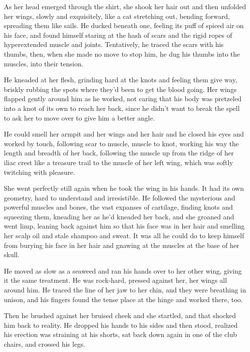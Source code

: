 As her head emerged through the shirt, she shook her hair out and then
unfolded her wings, slowly and exquisitely, like a cat stretching out,
bending forward, spreading them like sails.  He ducked beneath one,
feeling its puff of spiced air on his face, and found himself staring
at the hash of scars and the rigid ropes of hyperextended muscle and
joints.  Tentatively, he traced the scars with his thumbs, then, when
she made no move to stop him, he dug his thumbs into the muscles, into
their tension.

He kneaded at her flesh, grinding hard at the knots and feeling them
give way, briskly rubbing the spots where they'd been to get the blood
going.  Her wings flapped gently around him as he worked, not caring
that his body was pretzeled into a knot of its own to reach her back,
since he didn't want to break the spell to ask her to move over to
give him a better angle.

He could smell her armpit and her wings and her hair and he closed his
eyes and worked by touch, following scar to muscle, muscle to knot,
working his way the length and breadth of her back, following the
muscle up from the ridge of her iliac crest like a treasure trail to
the muscle of her left wing, which was softly twitching with pleasure.

She went perfectly still again when he took the wing in his hands.  It
had its own geometry, hard to understand and irresistible.  He
followed the mysterious and powerful muscles and bones, the vast
expanses of cartilage, finding knots and squeezing them, kneading her
as he'd kneaded her back, and she groaned and went limp, leaning back
against him so that his face was in her hair and smelling her scalp
oil and stale shampoo and sweat.  It was all he could do to keep
himself from burying his face in her hair and gnawing at the muscles
at the base of her skull.

He moved as slow as a seaweed and ran his hands over to her other
wing, giving it the same treatment.  He was rock-hard, pressed against
her, her wings all around him.  He traced the line of her jaw to her
chin, and they were breathing in unison, and his fingers found the
tense place at the hinge and worked there, too.

Then he brushed against her bruised cheek and she startled, and that
shocked him back to reality.  He dropped his hands to his sides and
then stood, realized his erection was straining at his shorts, sat
back down again in one of the club chairs, and crossed his legs.

